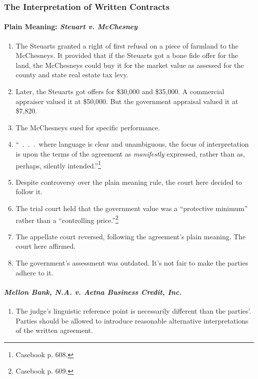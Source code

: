 \subsubsection{The Interpretation of Written Contracts}

\paragraph{Plain Meaning: \emph{Steuart v. McChesney}}

\begin{enumerate}
    \item The Steuarts granted a right of first refusal on a piece of farmland 
    to the McChesneys. It provided that if the Steuarts got a bone fide offer 
    for the land, the McChesneys could buy it for the market value as assessed 
    for the county and state real estate tax levy.
    \item Later, the Steuarts got offers for \$30,000 and \$35,000. A 
    commercial appraiser valued it at \$50,000. But the government appraisal 
    valued it at \$7,820.
    \item The McChesneys sued for specific performance.
    \item ``~.~.~.~where language is clear and unambiguous, the focus of 
    interpretation is upon the terms of the agreement as \emph{manifestly} 
    expressed, rather than as, perhaps, silently intended.''\footnote{Casebook 
    p. 608.}
    \item Despite controversy over the plain meaning rule, the court here 
    decided to follow it.
    \item The trial court held that the government value was a ``protective 
    minimum'' rather than a ``controlling price.''\footnote{Casebook p. 609.}
    \item The appellate court reversed, following the agreement's plain 
    meaning. The court here affirmed.
    \item The government's assessment was outdated. It's not fair to make the 
    parties adhere to it.
\end{enumerate}

\paragraph{\emph{Mellon Bank, N.A. v. Aetna Business Credit, Inc.}}

\begin{enumerate}
    \item The judge's linguistic reference point is necessarily different 
    than the parties'. Parties should be allowed to introduce reasonable 
    alternative interpretations of the written agreement.
\end{enumerate}

